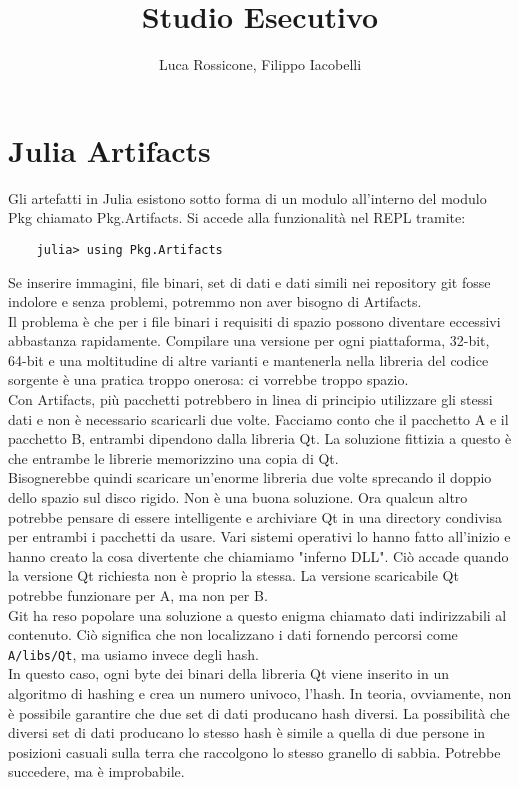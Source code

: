 \documentclass[a4paper]{extreport}
\title{\Huge Studio Esecutivo}
\author{Luca Rossicone, Filippo Iacobelli}
\begin{document}
\maketitle
\large
\section*{Julia Artifacts}
Gli artefatti\cite{artifacts} in Julia esistono sotto forma di un modulo all'interno del modulo Pkg chiamato Pkg.Artifacts. Si accede alla funzionalità nel REPL tramite:
\begin{verbatim}
    julia> using Pkg.Artifacts    
\end{verbatim}
Se inserire immagini, file binari, set di dati e dati simili nei repository git fosse indolore e senza problemi, potremmo non aver bisogno di Artifacts.\\
Il problema è che per i file binari i requisiti di spazio possono diventare eccessivi abbastanza rapidamente.
Compilare una versione per ogni piattaforma, 32-bit, 64-bit e una moltitudine di altre varianti e mantenerla nella libreria del codice sorgente è una pratica troppo onerosa: ci vorrebbe troppo spazio.\\
Con Artifacts, più pacchetti potrebbero in linea di principio utilizzare gli stessi dati e non è necessario scaricarli due volte. Facciamo conto che il pacchetto A e il pacchetto B, entrambi dipendono dalla libreria Qt. La soluzione fittizia a questo è che entrambe le librerie memorizzino una copia di Qt.\\
Bisognerebbe quindi scaricare un'enorme libreria due volte sprecando il doppio dello spazio sul disco rigido. Non è una buona soluzione. Ora qualcun altro potrebbe pensare di essere intelligente e archiviare Qt in una directory condivisa per entrambi i pacchetti da usare. Vari sistemi operativi lo hanno fatto all'inizio e hanno creato la cosa divertente che chiamiamo "inferno DLL". Ciò accade quando la versione Qt richiesta non è proprio la stessa. La versione scaricabile Qt potrebbe funzionare per A, ma non per B.\\
Git ha reso popolare una soluzione a questo enigma chiamato dati indirizzabili al contenuto. Ciò significa che non localizzano i dati fornendo percorsi come \verb|A/libs/Qt|, ma usiamo invece degli hash.\\
In questo caso, ogni byte dei binari della libreria Qt viene inserito in un algoritmo di hashing e crea un numero univoco, l'hash. In teoria, ovviamente, non è possibile garantire che due set di dati producano hash diversi. La possibilità che diversi set di dati producano lo stesso hash è simile a quella di due persone in posizioni casuali sulla terra che raccolgono lo stesso granello di sabbia. Potrebbe succedere, ma è improbabile.\\
\end{document}
